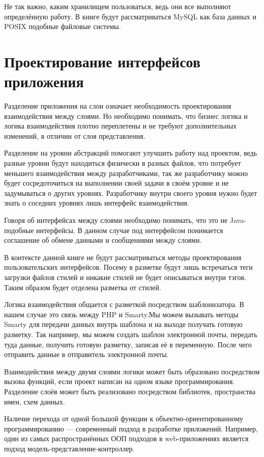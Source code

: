 Не так важно, каким хранилищем пользоваться, ведь они все выполняют определённую работу. В книге будут рассматриваться MySQL как база данных и POSIX подобные файловые системы.

\section{ Проектирование интерфейсов приложения } \label{sect2_3}

Разделение приложения на слои означает необходимость проектирования взаимодействия между слоями. Но необходимо понимать, что бизнес логика и логика взаимодействия плотно переплетены и не требуют дополнительных изменений, в отличии от слоя представления.

Разделение на уровни абстракций помогают улучшить работу над проектом, ведь разные уровни будут находиться физически в разных файлов, что потребует меньшего взаимодействия между разработчиками, так же разработчику можно будет сосредоточиться на выполнении своей задачи в своём уровне и не задумываться о других уровнях. Разработчику внутри своего уровня нужно будет знать о соседних уровнях лишь интерфейс взаимодействия.

Говоря об интерфейсах между слоями необходимо понимать, что это не Java-подобные интерфейсы. В данном случае под интерфейсом понимается соглашение об обмене данными и сообщениями между слоями.

В контексте данной книге не будут рассматриваться методы проектирования пользовательских интерфейсов. Посему в разметке будут лишь встречаться теги загрузки файлов стилей и никакие стилей не будет описываться внутри тэгов. Таким образом будет отделена разметка от стилей.

Логика взаимодействия общается с разметкой посредством шаблонизатора. В  нашем случае это связь между PHP и Smarty.Мы можем вызывать методы Smarty для передачи данных внутрь шаблона и на выходе получать готовую разметку. Так например, мы можем создать шаблон электронной почты, передать туда данные, получить готовую разметку, записав её в переменную. После чего отправить данные в отправитель электронной почты.

Взаимодействия между двумя слоями логики может быть образовано посредством вызова функций, если проект написан на одном языке программирования. Разделение слоёв может быть реализовано посредством библиотек, пространства имен, схем данных. 

Наличие перехода от одной большой функции к объектно-ориентированному программированию --- современный подход в разработке приложений. Например, один из самых распространённых ООП подходов в web-приложениях является подход модель-представление-контроллер.

